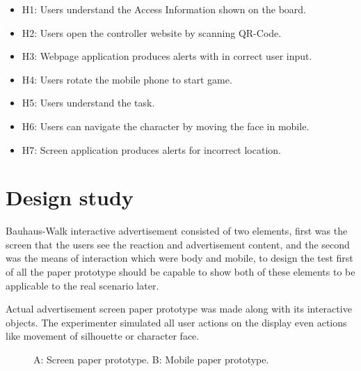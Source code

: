 \begin{itemize}
\item H1: Users understand the Access Information shown on the board.
\item H2: Users open the controller website by scanning QR-Code.
\item H3: Webpage application produces alerts with in correct user input.
\item H4: Users rotate the mobile phone to start game.
\item H5: Users understand the task.
\item H6: Users can navigate the character by moving the face in mobile.
\item H7: Screen application produces alerts for incorrect location.
\end{itemize}

\section{Design study}
Bauhaus-Walk interactive advertisement consisted of two elements, first was the screen that the users see the reaction and advertisement content, and the second was the means of interaction which were body and mobile, to design the test first of all the paper prototype should be capable to show both of these elements to be applicable to the real scenario later.

Actual advertisement screen paper prototype was made along with its interactive objects. The experimenter simulated all user actions on the display even actions like movement of silhouette or character face.


\begin{figure}[H]
    \centering
    \caption{A: Screen paper prototype. B: Mobile paper prototype. }%
    \label{fig:paper_prototype}%
\end{figure}



